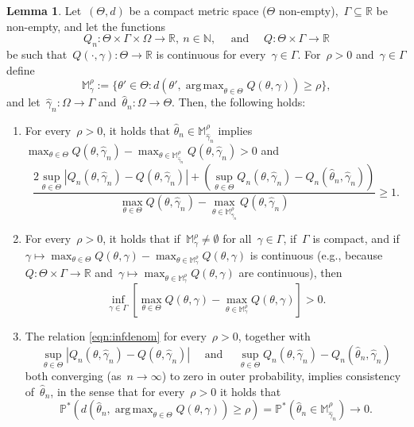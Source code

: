 \documentclass[11pt, a4paper]{article}
\newcommand{\N}{\mathbb{N}}
\newcommand{\R}{\mathbb{R}}
\DeclareMathOperator*{\argmax}{arg\,max}
\theoremstyle{definition}
\newtheorem{lemma}[theorem]{Lemma}
\begin{document}
\begin{lemma}\label{lem:mtune}
Let~$(\Theta,d)$ be a compact metric space ($\Theta$ non-empty),~$\Gamma \subseteq \R$ be non-empty, and let the functions~$$Q_n: \Theta \times \Gamma \times \Omega \to \R,~n \in \N, \quad \text{ and } \quad Q: \Theta \times \Gamma \to \R$$ be such that~$Q(\cdot, \gamma): \Theta \to \R$ is continuous for every~$\gamma \in \Gamma$. For~$\rho > 0$ and~$\gamma \in \Gamma$ define $$\mathbb{M}_{\gamma}^{\rho} := \{\theta' \in \Theta: d(\theta', \argmax_{\theta \in \Theta} Q(\theta, \gamma)) \geq \rho\},$$ and let~$\hat{\gamma}_n: \Omega \to \Gamma$ and~$\hat{\theta}_n: \Omega \to \Theta$. Then, the following holds:
\begin{enumerate}
\item For every~$\rho > 0$, it holds that $\hat{\theta}_n \in \mathbb{M}_{\hat{\gamma}_n}^{\rho}$ implies~$\max_{\theta \in \Theta} Q(\theta, \hat{\gamma}_n) - \max_{\theta \in \mathbb{M}_{\hat{\gamma}_n}^{\rho}} Q(\theta, \hat{\gamma}_n) > 0$ and
%
\begin{equation}\label{eqn:pcon}
\frac{2 \sup_{\theta \in \Theta} | Q_n(\theta, \hat{\gamma}_n) - Q(\theta, \hat{\gamma}_n) | + \left(\sup_{\theta \in \Theta} Q_n(\theta, \hat{\gamma}_n) - Q_n(\hat{\theta}_n, \hat{\gamma}_n)\right)}{\max_{\theta \in \Theta} Q(\theta, \hat{\gamma}_n) - \max_{\theta \in \mathbb{M}_{\hat{\gamma}_n}^{\rho}} Q(\theta, \hat{\gamma}_n)}  \geq 1.
\end{equation}
%
\item For every~$\rho > 0$, it holds that if~$\mathbb{M}_{\gamma}^{\rho} \neq \emptyset$ for all~$\gamma \in \Gamma$, if~$\Gamma$ is compact, and if $\gamma \mapsto \max_{\theta \in \Theta} Q(\theta, \gamma) - \max_{\theta \in \mathbb{M}_{\gamma}^{\rho}} Q(\theta, \gamma)$ is continuous (e.g., because~$Q: \Theta \times \Gamma \to \R$ and~$\gamma \mapsto \max_{\theta \in \mathbb{M}_{\gamma}^{\rho}} Q(\theta, \gamma)$ are continuous), then 
\begin{equation}\label{eqn:infdenom}
\inf_{\gamma \in \Gamma} \left[ \max_{\theta \in \Theta} Q(\theta, \gamma) - \max_{\theta \in \mathbb{M}_{\gamma}^{\rho}} Q(\theta, \gamma) \right] > 0.
\end{equation}
\item The relation \eqref{eqn:infdenom} for every~$\rho > 0$, together with~$$\sup_{\theta \in \Theta} | Q_n(\theta, \hat{\gamma}_n) - Q(\theta, \hat{\gamma}_n) | \quad \text{ and } \quad \sup_{\theta \in \Theta} Q_n(\theta, \hat{\gamma}_n) - Q_n(\hat{\theta}_n, \hat{\gamma}_n)$$ both converging (as~$n \to \infty$) to zero in outer probability, implies consistency of~$\hat{\theta}_n$, in the sense that for every~$\rho > 0$ it holds that $$\mathbb{P}^* \left( d(\hat{\theta}_n, \argmax_{\theta \in \Theta} Q(\theta, \gamma)) \geq \rho \right) = \mathbb{P}^* \left( \hat{\theta}_n \in \mathbb{M}_{\hat{\gamma}_n}^{\rho} \right) \to 0.$$
\end{enumerate}   
\end{lemma}
\end{document}
